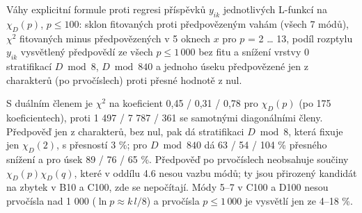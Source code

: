 \documentclass[
  10pt,
]{article}
\begin{document}
Váhy explicitní formule proti regresi příspěvků \(y_{ik}\) jednotlivých
L-funkcí na \(\chi_D(p)\), \(p \le 100\): sklon fitovaných proti
předpovězeným vahám (všech 7 módů), \(\chi^2\) fitovaných minus
předpovězených v 5 oknech \(x\) pro \(p\) = 2 \ldots{} 13, podíl
rozptylu \(y_{ik}\) vysvětlený předpovědí ze všech \(p \le 1\,000\) bez
fitu a snížení vrstvy 0 stratifikací \(D \bmod 8\), \(D \bmod 840\) a
jednoho úseku předpovězené jen z charakterů (po prvočíslech) proti
přesné hodnotě z nul.

S duálním členem je \(\chi^2\) na koeficient 0,45 / 0,31 / 0,78 pro
\(\chi_D(p)\) (po 175 koeficientech), proti 1 497 / 7 787 / 361 se
samotnými diagonálními členy. Předpověď jen z charakterů, bez nul, pak
dá stratifikaci \(D \bmod 8\), která fixuje jen \(\chi_D(2)\), s
přesností 3 \%; pro \(D \bmod 840\) dá 63 / 54 / 104 \% přesného snížení
a pro úsek 89 / 76 / 65 \%. Předpověď po prvočíslech neobsahuje součiny
\(\chi_D(p)\chi_D(q)\), které v oddílu 4.6 nesou vazbu módů; ty jsou
přirozený kandidát na zbytek v B10 a C100, zde se nepočítají. Módy 5--7
v C100 a D100 nesou prvočísla nad 1 000 (\(\ln p \approx k\,l/8\)) a
prvočísla \(p \le 1\,000\) je vysvětlí jen ze 4--18 \%.
\end{document}
